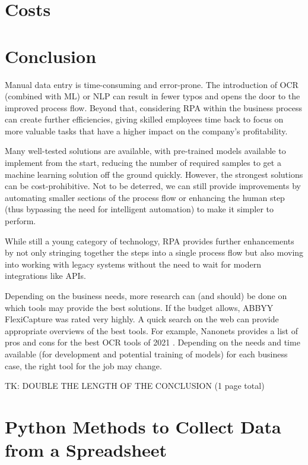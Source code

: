 \documentclass[conference, draftcls]{IEEEtran}
\begin{document}
\section{Costs} \label{sectionCosts}

\section{Conclusion}
Manual data entry is time-consuming and error-prone. The introduction of OCR (combined with ML) or NLP can result in fewer typos and opens the door to the improved process flow. Beyond that, considering RPA within the business process can create further efficiencies, giving skilled employees time back to focus on more valuable tasks that have a higher impact on the company's profitability.

Many well-tested solutions are available, with pre-trained models available to implement from the start, reducing the number of required samples to get a machine learning solution off the ground quickly. However, the strongest solutions can be cost-prohibitive. Not to be deterred, we can still provide improvements by automating smaller sections of the process flow or enhancing the human step (thus bypassing the need for intelligent automation) to make it simpler to perform.

While still a young category of technology, RPA provides further enhancements by not only stringing together the steps into a single process flow but also moving into working with legacy systems without the need to wait for modern integrations like APIs.

Depending on the business needs, more research can (and should) be done on which tools may provide the best solutions. If the budget allows, ABBYY FlexiCapture was rated very highly. A quick search on the web can provide appropriate overviews of the best tools. For example, Nanonets provides a list of pros and cons for the best OCR tools of 2021 \cite{prithiv2021best}. Depending on the needs and time available (for development and potential training of models) for each business case, the right tool for the job may change.

TK: DOUBLE THE LENGTH OF THE CONCLUSION (1 page total)




\onecolumn
\appendices

\newpage
\section{Python Methods to Collect Data from a Spreadsheet} \label{appendixOrderOne}
\end{document}
